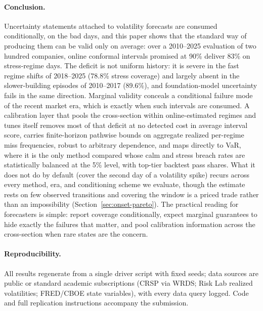 \paragraph{Conclusion.} Uncertainty statements attached to volatility
forecasts are consumed conditionally, on the bad days, and this
paper shows that the standard way of producing them can be valid only on
average: over a 2010--2025 evaluation of two hundred companies, online
conformal intervals promised at 90\% deliver 83\% on stress-regime days.
The deficit is not uniform history: it is severe in the fast regime
shifts of 2018--2025 (78.8\% stress coverage) and largely absent in the
slower-building episodes of 2010--2017 (89.6\%), and foundation-model
uncertainty fails in the same direction. Marginal validity conceals a
conditional failure mode of the recent market era, which is exactly when
such intervals are consumed. A calibration layer that pools the cross-section within
online-estimated regimes and tunes itself removes most of that deficit at
no detected cost in average interval score, carries finite-horizon
pathwise bounds on aggregate realized per-regime miss frequencies,
robust to arbitrary dependence, and maps directly to VaR,
where it is the only method compared whose calm and stress breach rates
are statistically balanced at the 5\% level, with top-tier backtest
pass shares. What
it does not do by default (cover the second day of a volatility spike)
recurs across every method, era, and conditioning scheme we evaluate,
though the estimate rests on few observed transitions and covering the
window is a priced trade rather than an impossibility
(Section~\ref{sec:onset-pareto}). The practical reading for forecasters is
simple: report coverage conditionally, expect marginal guarantees to hide
exactly the failures that matter, and pool calibration information across
the cross-section when rare states are the concern.

\paragraph{Reproducibility.} All results regenerate from a single driver
script with fixed seeds; data sources are public or standard academic
subscriptions (CRSP via WRDS; Risk Lab realized volatilities; FRED/CBOE
state variables), with every data query logged. Code and full replication
instructions accompany the submission.
